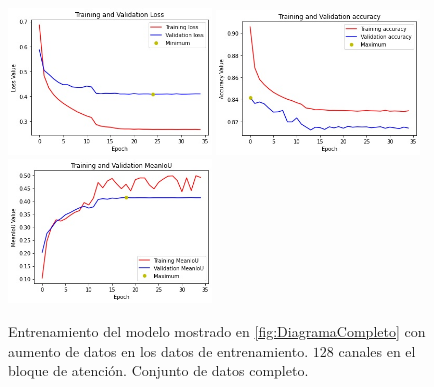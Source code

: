 \begin{figure}[htpb]
  \centering
  \includegraphics[width=0.48\textwidth]{../../modelos-entrenados/unet-nonlocal/ejecucion8/loss}
  \includegraphics[width=0.48\textwidth]{../../modelos-entrenados/unet-nonlocal/ejecucion8/acc}
  \includegraphics[width=0.48\textwidth]{../../modelos-entrenados/unet-nonlocal/ejecucion8/iou}
  \caption{Entrenamiento del modelo mostrado en \autoref{fig:DiagramaCompleto} con aumento de datos en los datos de entrenamiento. $128$ canales en el bloque de atención. Conjunto de datos completo.}
  \label{fig:ejec8}
\end{figure}

